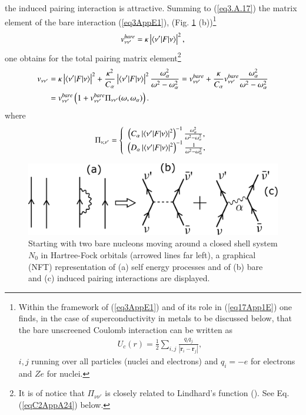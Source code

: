  the induced pairing interaction is attractive.
Summing to (\ref{eq3.A.17}) the matrix element of the bare interaction (\ref{eq3AppE1}), (Fig. \ref{fig3_A_3} (b))\footnote{\label{f82C1} Within the framework of (\ref{eq3AppE1}) and of its role in (\ref{eq17App1E}) one finds, in the case of superconductivity in metals to be discussed below,  that the bare unscreened Coulomb interaction can be written as 
	\begin{align*}
	U_c(r)=\frac{1}{2}\sum_{i,j}\frac{q_iq_j}{|\mathbf r_i-\mathbf r_j|}, 
	\end{align*}
	$i,j$ running over all particles (nuclei and electrons) and $q_i=-e$ for electrons and $Ze$ for nuclei.}
\begin{align}
v_{\nu\nu'}^{bare}=\kappa\left|\langle {\nu'|F|\nu} \rangle\right|^2,
\end{align}
one obtains for the total pairing matrix element\footnote{It is of notice that $\Pi_{\nu\nu'}$ is closely related to Lindhard's function (\cite{Lindhard:53}). See Eq. (\ref{eqC2AppA24}) below.}
\begin{align}\label{eq17App1E}
\nonumber v_{\nu\nu'}&=\kappa\left|\braket{\nu'|F|\nu}\right|^2+\frac{\kappa^2}{C_\alpha}\left|\braket{\nu'|F|\nu}\right|^2\frac{\omega_\alpha^2}{\omega^2-\omega_\alpha^2}=v^{bare}_{\nu\nu'}+\frac{\kappa}{C_\alpha}v^{bare}_{\nu\nu'}\frac{\omega_\alpha^2}{\omega^2-\omega_\alpha^2}\\
&=v_{\nu\nu'}^{bare}\left(1+v_{\nu\nu'}^{bare}\Pi_{\nu\nu'}(\omega,\omega_\alpha)\right). \idx{Induced pairing interaction}
\end{align}
where
\begin{align}
\Pi_{\nu,\nu'}=\left\{\begin{array}{c}
 \left(C_\alpha\left|\langle {\nu'|F|\nu} \rangle\right|^2\right)^{-1}\frac{\omega_\alpha^2}{\omega^2-\omega_\alpha^2},\\ 
\left(D_\alpha\left|\langle {\nu'|F|\nu} \rangle\right|^2\right)^{-1}\frac{1}{\omega^2-\omega_\alpha^2},
\end{array}
\right. 
\end{align}
   \begin{figure}
   \centerline{\includegraphics*[width=12cm,angle=0	]{nutshell/figs/fig3_A_3}}
   \caption{Starting with two bare nucleons moving around a closed shell system $N_0$ in Hartree-Fock orbitals (arrowed lines far left), a graphical (NFT) representation of (a) self energy processes and of (b) bare and (c) induced pairing interactions are displayed.}\label{fig3_A_3}
   \end{figure}
